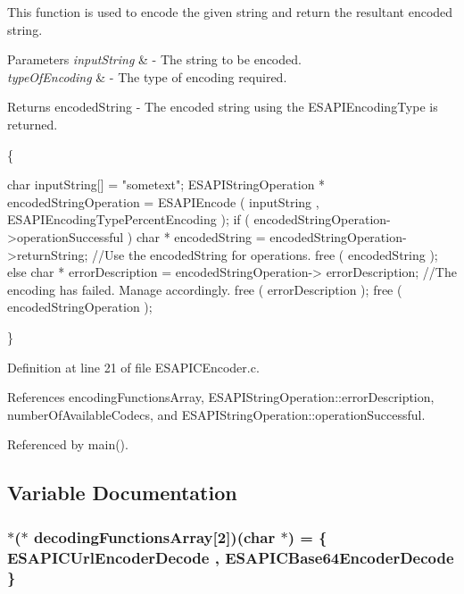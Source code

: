 This function is used to encode the given string and return the resultant encoded string. 


\begin{DoxyParams}{Parameters}
{\em inputString} & -\/ The string to be encoded. \\
\hline
{\em typeOfEncoding} & -\/ The type of encoding required. \\
\hline
\end{DoxyParams}
\begin{DoxyReturn}{Returns}
encodedString -\/ The encoded string using the ESAPIEncodingType is returned.
\end{DoxyReturn}
\{ 
\begin{DoxyCode}
        char inputString[] = "sometext";
        ESAPIStringOperation * encodedStringOperation = ESAPIEncode ( inputString
      , ESAPIEncodingTypePercentEncoding );
        if ( encodedStringOperation->operationSuccessful )
        {
                char * encodedString = encodedStringOperation->returnString;
                //Use the encodedString for operations.
                free ( encodedString );
        }
        else
        {
                char * errorDescription = encodedStringOperation->
      errorDescription;
                //The encoding has failed. Manage accordingly.
                free ( errorDescription );
        }
        free ( encodedStringOperation );
\end{DoxyCode}
 \} 

Definition at line 21 of file ESAPICEncoder.c.



References encodingFunctionsArray, ESAPIStringOperation::errorDescription, numberOfAvailableCodecs, and ESAPIStringOperation::operationSuccessful.



Referenced by main().



\subsection{Variable Documentation}
\hypertarget{a00022_a7f307a92758e8a838c0fa727d46bcb21}{
\subsubsection[{decodingFunctionsArray}]{$\ast$($\ast$  {\bf decodingFunctionsArray}\mbox{[}2\mbox{]})(char $\ast$) = \{ ESAPICUrlEncoderDecode , ESAPICBase64EncoderDecode \}}}
\label{d7/de0/a00022_a7f307a92758e8a838c0fa727d46bcb21}


